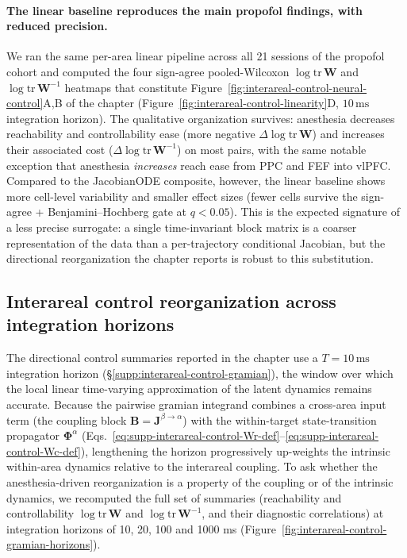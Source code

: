 \paragraph{The linear baseline reproduces the main propofol findings, with reduced precision.}
We ran the same per-area linear pipeline across all 21 sessions of the propofol cohort and computed the four sign-agree pooled-Wilcoxon $\log\mathrm{tr}\,\mathbf{W}$ and $\log\mathrm{tr}\,\mathbf{W}^{-1}$ heatmaps that constitute Figure~\ref{fig:interareal-control-neural-control}A,B of the chapter (Figure~\ref{fig:interareal-control-linearity}D, $10\,\mathrm{ms}$ integration horizon). The qualitative organization survives: anesthesia decreases reachability and controllability ease (more negative $\Delta\log\mathrm{tr}\,\mathbf{W}$) and increases their associated cost ($\Delta\log\mathrm{tr}\,\mathbf{W}^{-1}$) on most pairs, with the same notable exception that anesthesia \emph{increases} reach ease from PPC and FEF into vlPFC. Compared to the JacobianODE composite, however, the linear baseline shows more cell-level variability and smaller effect sizes (fewer cells survive the sign-agree + Benjamini--Hochberg gate at $q<0.05$). This is the expected signature of a less precise surrogate: a single time-invariant block matrix is a coarser representation of the data than a per-trajectory conditional Jacobian, but the directional reorganization the chapter reports is robust to this substitution.

\subsection{Interareal control reorganization across integration horizons}\label{supp:interareal-control-horizons}

The directional control summaries reported in the chapter use a $T=10\,\mathrm{ms}$ integration horizon (\S\ref{supp:interareal-control-gramian}), the window over which the local linear time-varying approximation of the latent dynamics remains accurate. Because the pairwise gramian integrand combines a cross-area input term (the coupling block $\mathbf{B}=\mathbf{J}^{\beta\to\alpha}$) with the within-target state-transition propagator $\mathbf{\Phi}^{\alpha}$ (Eqs.~\ref{eq:supp-interareal-control-Wr-def}--\ref{eq:supp-interareal-control-Wc-def}), lengthening the horizon progressively up-weights the intrinsic within-area dynamics relative to the interareal coupling. To ask whether the anesthesia-driven reorganization is a property of the coupling or of the intrinsic dynamics, we recomputed the full set of summaries (reachability and controllability $\log\mathrm{tr}\,\mathbf{W}$ and $\log\mathrm{tr}\,\mathbf{W}^{-1}$, and their diagnostic correlations) at integration horizons of 10, 20, 100 and 1000 ms (Figure~\ref{fig:interareal-control-gramian-horizons}).

